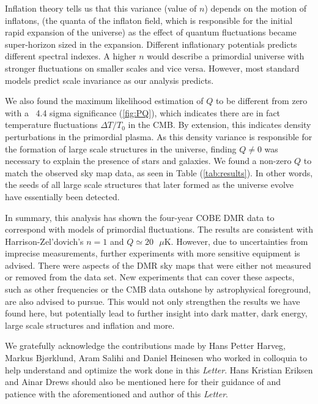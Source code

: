 \documentclass{emulateapj}
\begin{document}
Inflation theory tells us %
 that this variance (value of $n$) depends on the motion of inflatons, (the quanta of the inflaton field, which is responsible for the initial rapid expansion of the universe) as the effect of quantum fluctuations became super-horizon sized in the expansion. Different inflationary potentials predicts different spectral indexes. A higher $n$ would describe a primordial universe with stronger fluctuations on smaller scales and vice versa. However, most standard models predict scale invariance as our analysis predicts.

We also found the maximum likelihood estimation of $Q$ to be different from zero with a ~4.4 sigma significance (\ref{fig:PQ}), which indicates there are in fact temperature fluctuations $\Delta T / T_0$ in the CMB. By extension, this indicates density perturbations in the primordial plasma. As this density variance is responsible for the formation of large scale structures in the universe, finding $Q \neq 0$ was necessary to explain the presence of stars and galaxies. We found a non-zero $Q$ to match the observed sky map data, as seen in Table (\ref{tab:results}). In other words, the seeds of all large scale structures that later formed as the universe evolve have essentially been detected.  


In summary, this analysis has shown the four-year COBE DMR data to correspond with models of primordial fluctuations. The results are consistent with Harrison-Zel'dovich's $n = 1$ and $Q \simeq 20 \text{ }\mu$K. However, due to uncertainties from imprecise measurements, further experiments with more sensitive equipment is advised. There were aspects of the DMR sky maps that were either not measured or removed from the data set. New experiments that can cover these aspects, such as other frequencies or the CMB data outshone by astrophysical foreground, are also advised to pursue. This would not only strengthen the results we have found here, but potentially lead to further insight into dark matter, dark energy, large scale structures and inflation and more.




\begin{acknowledgements}
  We gratefully acknowledge the contributions made by Hans Petter Harveg, Markus Bjørklund, Aram Salihi and Daniel Heinesen who worked in colloquia to help understand and optimize the work done in this \textit{Letter}. Hans Kristian Eriksen and Ainar Drews should also be mentioned here for their guidance of and patience with the aforementioned and author of this \textit{Letter}.
\end{acknowledgements}
\end{document}
